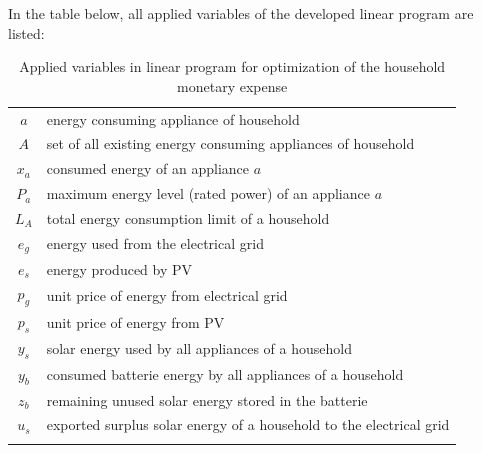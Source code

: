 In the table below, all applied variables of the developed linear program are listed:

\begin{longtable}{c|l}
	\hline
    $a$ & energy consuming appliance of household \\
	$A$ & set of all existing energy consuming appliances of household \\
	$x_{a}$ & consumed energy of an appliance $a$ \\
	$P_{a}$ & maximum energy level (rated power) of an appliance $a$ \\
	$L_{A}$ & total energy consumption limit of a household \\
	$e_{g}$ & energy used from the electrical grid \\
	$e_{s}$ & energy produced by PV \\
	$p_{g}$ & unit price of energy from electrical grid \\
	$p_{s}$ & unit price of energy from PV \\
	$y_{s}$ & solar energy used by all appliances of a household \\
	$y_{b}$ & consumed batterie energy by all appliances of a household \\
	$z_{b}$ & remaining unused solar energy stored in the batterie \\
	$u_{s}$ & exported surplus solar energy of a household to the electrical grid \\
	\hline
	\caption{Applied variables in linear program for optimization of the household monetary expense}
	\label{table:sorted_gas_prices}
\end{longtable} 

